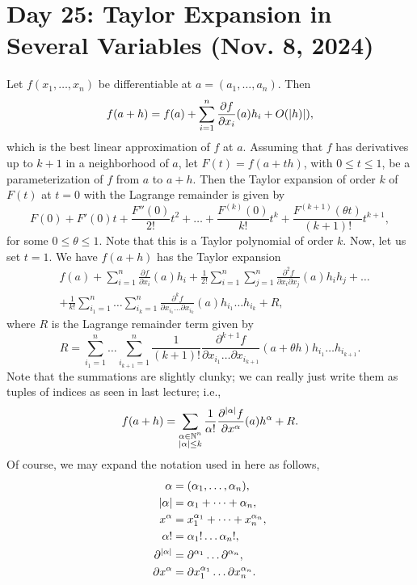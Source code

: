 \section{Day 25: Taylor Expansion in Several Variables (Nov. 8, 2024)}
Let $f(x_1, \dots, x_n)$ be differentiable at $a = (a_1, \dots, a_n)$. Then
\[ f(a + h) = f(a) + \sum_{i=1}^n \frac{\partial f}{\partial x_i}(a) h_i + O(\left\lvert h) \right\rvert), \]
which is the best linear approximation of $f$ at $a$. Assuming that $f$ has derivatives up to $k + 1$ in a neighborhood of $a$, let $F(t) = f(a + th)$, with $0 \leq t \leq 1$, be a parameterization of $f$ from $a$ to $a+h$. Then the Taylor expansion of order $k$ of $F(t)$ at $t = 0$ with the Lagrange remainder is given by
\[ F(0) + F'(0)t + \frac{F''(0)}{2!}t^2 + \dots + \frac{F^{(k)}(0)}{k!} t^k + \frac{F^{(k+1)}(\theta t)}{(k+1)!} t^{k+1}, \]
for some $0 \leq \theta \leq 1$. Note that this is a Taylor polynomial of order $k$. Now, let us set $t = 1$. We have $f(a + h)$ has the Taylor expansion
\begin{align*}
    & f(a) + \sum_{i=1}^n \frac{\partial f}{\partial x_i}(a) h_i + \frac{1}{2!} \sum_{i=1}^n \sum_{j=1}^n \frac{\partial^2 f}{\partial x_i \partial x_j} (a) h_i h_j + \dots \\
    & + \frac{1}{k!} \sum_{i_1 = 1}^n \dots \sum_{i_k = 1}^n \frac{\partial^k f}{\partial x_{i_1} \dots \partial x_{i_k}} (a) h_{i_1} \dots h_{i_k} + R,
\end{align*}
where $R$ is the Lagrange remainder term given by 
\[ R = \sum_{i_1 = 1}^n \dots \sum_{i_{k+1} = 1}^n \frac{1}{(k+1)!} \frac{\partial^{k+1} f}{\partial x_{i_1} \dots \partial x_{i_{k+1}}} (a + \theta h) h_{i_1} \dots h_{i_{k+1}}. \]
Note that the summations are slightly clunky; we can really just write them as tuples of indices as seen in last lecture; i.e.,
\[ f(a + h) = \sum_{\substack{\alpha \in \mathbb N^n \\ \left\lvert \alpha \right\rvert \leq k}} \frac{1}{\alpha!} \frac{\partial^{\left\lvert \alpha \right\rvert} f}{\partial x^\alpha} (a) h^\alpha + R. \]
Of course, we may expand the notation used in here as follows,
\begin{align*}
    \alpha &= (\alpha_1, \dots, \alpha_n), \\
    \left\lvert \alpha \right\rvert &= \alpha_1 + \dots + \alpha_n, \\
    x^\alpha &= x_1^{\alpha_1} + \dots + x_n^{\alpha_n}, \\
    \alpha! &= \alpha_1! \dots \alpha_n!, \\
    \partial^{\left\lvert \alpha \right\rvert} &= \partial^{\alpha_1} \dots \partial^{\alpha_n}, \\
    \partial x^\alpha &= \partial x_1^{\alpha_1} \dots \partial x_n^{\alpha_n}.
\end{align*}

